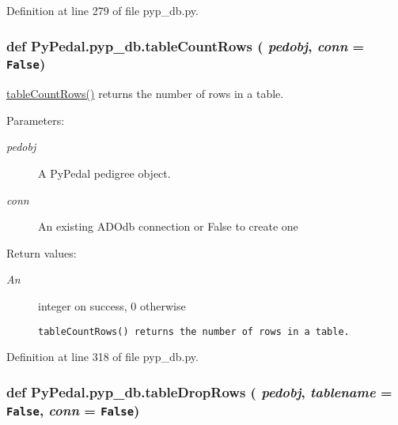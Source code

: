 Definition at line 279 of file pyp\_\-db.py.\hypertarget{namespacePyPedal_1_1pyp__db_f72099782c3e8cc304dcada96aa77d21}{
\subsubsection[tableCountRows]{\setlength{\rightskip}{0pt plus 5cm}def Py\-Pedal.pyp\_\-db.table\-Count\-Rows ( {\em pedobj},  {\em conn} = {\tt False})}}
\label{namespacePyPedal_1_1pyp__db_f72099782c3e8cc304dcada96aa77d21}


\hyperlink{namespacePyPedal_1_1pyp__db_f72099782c3e8cc304dcada96aa77d21}{table\-Count\-Rows()} returns the number of rows in a table. 

\begin{Desc}
\item[Parameters:]
\begin{description}
\item[{\em pedobj}]A Py\-Pedal pedigree object. \item[{\em conn}]An existing ADOdb connection or False to create one \end{description}
\end{Desc}
\begin{Desc}
\item[Return values:]
\begin{description}
\item[{\em An}]integer on success, 0 otherwise

\footnotesize\begin{verbatim}tableCountRows() returns the number of rows in a table.
\end{verbatim}
\normalsize
 \end{description}
\end{Desc}


Definition at line 318 of file pyp\_\-db.py.\hypertarget{namespacePyPedal_1_1pyp__db_b164d7c09eb9d86560432668b491a467}{
\subsubsection[tableDropRows]{\setlength{\rightskip}{0pt plus 5cm}def Py\-Pedal.pyp\_\-db.table\-Drop\-Rows ( {\em pedobj},  {\em tablename} = {\tt False},  {\em conn} = {\tt False})}}
\label{namespacePyPedal_1_1pyp__db_b164d7c09eb9d86560432668b491a467}


